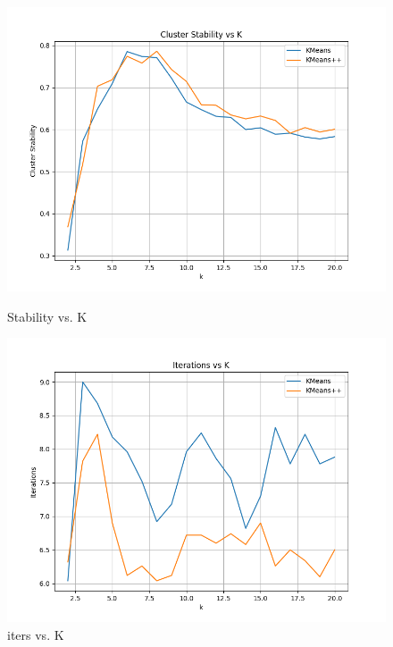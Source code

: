 \documentclass[8pt]{article}
\begin{document}
\begin{figure}[H]
    \centering
    \begin{minipage}{0.45\textwidth}
        \centering
        \includegraphics[width=\textwidth]{./Prob4/out/task_2_2/stabilities_k20.png}
        \caption{Stability vs. K}
        \label{fig: Kmeans vs. Kmeans++ Stability 50rounds}
    \end{minipage}
    \hfill
    \begin{minipage}{0.45\textwidth}
        \centering
        \includegraphics[width=\textwidth]{./Prob4/out/task_2_2/iters_k20.png}
        \caption{iters vs. K}
        \label{fig: Kmeans vs. Kmeans++ iters 50rounds}
    \end{minipage}
    \hfill
\end{figure}
\end{document}
